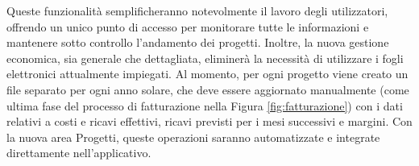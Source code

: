 Queste funzionalità semplificheranno notevolmente il lavoro degli utilizzatori, offrendo un unico punto di accesso per monitorare tutte le informazioni e mantenere
sotto controllo l’andamento dei progetti. Inoltre, la nuova gestione economica, sia generale che dettagliata, eliminerà la necessità di utilizzare i fogli elettronici
attualmente impiegati. Al momento, per ogni progetto viene creato un file separato per ogni anno solare, che deve essere aggiornato manualmente (come ultima fase del
processo di fatturazione nella Figura \ref{fig:fatturazione}) con i dati relativi a costi e ricavi effettivi, ricavi previsti per i mesi successivi e margini. Con la nuova area
Progetti, queste operazioni saranno automatizzate e integrate direttamente nell’applicativo.